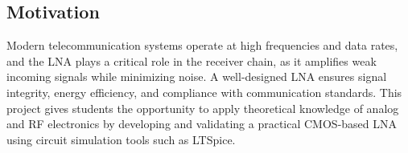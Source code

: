 \subsection{Motivation}

Modern telecommunication systems operate at high frequencies and data rates, and the LNA plays a critical role in the receiver chain, as it amplifies weak incoming signals while minimizing noise. A well-designed LNA ensures signal integrity, energy efficiency, and compliance with communication standards. This project gives students the opportunity to apply theoretical knowledge of analog and RF electronics by developing and validating a practical CMOS-based LNA using circuit simulation tools such as LTSpice.